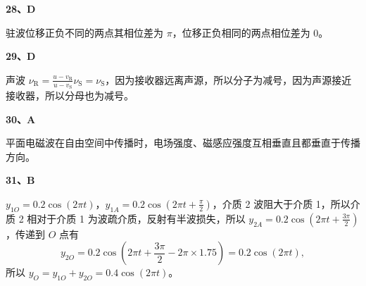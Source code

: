 \documentclass[UTF8,zihao=5,fontset=none,a4paper]{ctexart}
\newcounter{question}
\newcommand{\ans}[2]{\par\Needspace{4\baselineskip}\textbf{#1、#2}\par}
\newenvironment{questionblock}{\par\addvspace{5pt}\noindent
  \begin{minipage}{\linewidth}\setlength{\parskip}{4pt}}
  {\end{minipage}\par\addvspace{5pt}}
\begin{document}
\begin{questionblock}
\ans{28}{D}
驻波位移正负不同的两点其相位差为 $\pi$，位移正负相同的两点相位差为 0。
\end{questionblock}
\begin{questionblock}
\ans{29}{D}
声波 $\nu_{\mathrm R}=\frac{u-v_{\mathrm R}}{u-v_{\mathrm S}}\nu_{\mathrm S}=\nu_{\mathrm S}$，因为接收器远离声源，所以分子为减号，因为声源接近接收器，所以分母也为减号。
\end{questionblock}
\begin{questionblock}
\ans{30}{A}
平面电磁波在自由空间中传播时，电场强度、磁感应强度互相垂直且都垂直于传播方向。
\end{questionblock}
\begin{questionblock}
\ans{31}{B}
$y_{1O}=0.2\cos(2\pi t)$，$y_{1A}=0.2\cos(2\pi t+\frac\pi2)$，介质 2 波阻大于介质 1，所以介质 2 相对于介质 1 为波疏介质，反射有半波损失，所以
$y_{2A}=0.2\cos(2\pi t+\frac{3\pi}2)$，传递到 $O$ 点有
\[
y_{2O}=0.2\cos\left(2\pi t+\frac{3\pi}2-2\pi\times1.75\right)
=0.2\cos(2\pi t),
\]
所以 $y_O=y_{1O}+y_{2O}=0.4\cos(2\pi t)$。
\end{questionblock}
\end{document}
